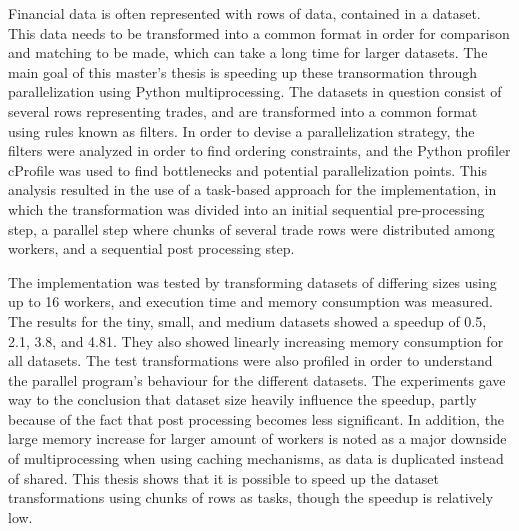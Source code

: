 Financial data is often represented with rows of data, contained in a dataset. This data needs to be transformed into a common format in order for
comparison and matching to be made, which can take a long time for larger datasets.
The main goal of this master’s thesis is speeding up these transormation through parallelization using Python multiprocessing.
The datasets in question consist of several rows representing trades, and are transformed into a common format using rules known as filters. In order to devise a
parallelization strategy, the filters were analyzed in order to find ordering constraints, and the Python profiler cProfile was used to find bottlenecks
and potential parallelization points. This analysis resulted in the use of a task-based approach for the implementation, in which the transformation
was divided into an initial sequential pre-processing step, a parallel step where chunks of several trade rows were distributed among workers, and a
sequential post processing step. 

The implementation was tested by transforming datasets of differing sizes using up to 16 workers, and execution time and memory consumption
was measured. The results for the tiny, small, and medium datasets showed a speedup of 0.5, 2.1, 3.8, and 4.81. They also showed linearly increasing
memory consumption for all datasets.  The test transformations were also profiled in order to understand the parallel program’s behaviour for the
different datasets. The experiments gave way to the conclusion that dataset size heavily influence the speedup, partly because of the fact that
post processing becomes less significant.  In addition, the large memory increase for larger amount of workers is noted as a major downside of
multiprocessing when using caching mechanisms, as data is duplicated instead of shared. This thesis shows that it is possible to speed up the
dataset transformations using chunks of rows as tasks, though the speedup is relatively low.
